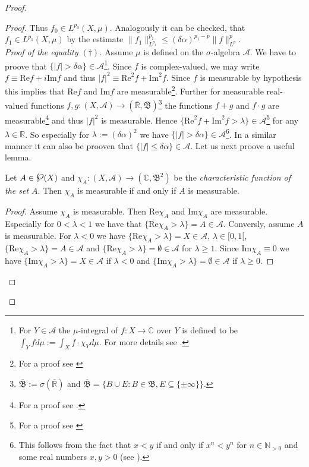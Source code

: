 \begin{proof}
\begin{proof}
Thus $f_0 \in L^{p_0}(X,\mu)$. Analogously it can be checked, that $f_1 \in L^{p_1}(X,\mu)$ by the estimate $\|f_1\|^{p_1}_{L^{p_1}} \leqslant (\delta\alpha)^{p_1 - p}\|f\|_{L^p}^p$.\\

	\emph{Proof of the equality $(\dagger)$.} Assume $\mu$ is defined on the $\sigma$-algebra $\mathcal{A}$. We have to proove that $\{\vert f \vert > \delta\alpha\} \in \mathcal{A}$\footnote{
		For $Y \in \mathcal{A}$ the $\mu$-integral of $f: X \rightarrow \mathbb{C}$ over $Y$ is defined to be $\displaystyle \int_Y fd\mu := \int_X f \cdot \chi_Y d\mu$. For more details see \cite[135--136]{elstrodt:mass:2011}.}.
		Since $f$ is complex-valued, we may write $f \equiv \mathrm{Re} f + i\mathrm{Im}f$ and thus $\vert f\vert^2 \equiv \mathrm{Re}^2 f + \mathrm{Im}^2f$. Since $f$ is measurable by hypothesis this implies that $ \mathrm{Re} f$ and $\mathrm{Im}f$ are measurable\footnote{For a proof see \cite[106]{elstrodt:mass:2011}}. Further for measurable real-valued functions $f,g: (X,\mathcal{A}) \rightarrow (\overline{\mathbb{R}},\overline{\mathfrak{B}})$\footnote{$\overline{\mathfrak{B}} := \sigma(\overline{\mathbb{R}})$ and $\overline{\mathfrak{B}} = \{B \cup E : B \in \mathfrak{B}, E \subseteq \{\pm \infty\}\}$.} 
		the functions $f + g$ and $f \cdot g$ are measurable\footnote{For a proof see \cite[107]{elstrodt:mass:2011}.}
		and thus $\vert f \vert^2$ is measurable. Hence $\{ \mathrm{Re}^2 f + \mathrm{Im}^2f > \lambda\} \in \mathcal{A}$\footnote{For a proof see \cite[105--106]{elstrodt:mass:2011}} for any $\lambda \in \mathbb{R}$. So especially for $\lambda := (\delta\alpha)^2$ we have $\{\vert f \vert > \delta\alpha\} \in \mathcal{A}$\footnote{This follows from the fact that $x < y$ if and only if $x^n < y^n$ for $n \in \mathbb{N}_{>0}$ and some real numbers $x,y > 0$ (see \cite[119]{zorich:analysis_I:2004}).}.
	In a similar manner it can also be prooven that $\{\vert f\vert \leqslant \delta \alpha\} \in \mathcal{A}$. Let us next proove a useful lemma.

	\begin{lemma}
		Let $A \in \powerset(X)$ and $\chi_A: (X,\mathcal{A}) \rightarrow (\mathbb{C},\mathfrak{B}^2)$ be the \emph{characteristic function of the set $A$}. Then $\chi_A$ is measurable if and only if $A$ is measurable.
			\label{lem:charfun}
	\end{lemma}
		
	\begin{proof}
		Assume $\chi_A$ is measurable. Then $\mathrm{Re}\chi_A$ and $\mathrm{Im}\chi_A$ are measurable. Especially for $0 < \lambda < 1$ we have that $\{\mathrm{Re}\chi_A > \lambda\} = A \in \mathcal{A}$. Conversly, assume $A$ is measurable. For $\lambda < 0$ we have $\{\mathrm{Re}\chi_A > \lambda\} = X \in \mathcal{A}$, $\lambda \in [0,1[$, $\{\mathrm{Re}\chi_A > \lambda\} = A \in \mathcal{A}$ and $\{\mathrm{Re}\chi_A > \lambda\} = \emptyset \in \mathcal{A}$ for $\lambda \geqslant 1$. Since $\mathrm{Im}\chi_A \equiv 0$ we have $\{\mathrm{Im}\chi_A > \lambda \} = X \in \mathcal{A}$ if $\lambda < 0$ and $\{\mathrm{Im}\chi_A > \lambda\} = \emptyset \in \mathcal{A}$ if $\lambda \geqslant 0$.   
	\end{proof}


\end{proof}
\end{proof}
